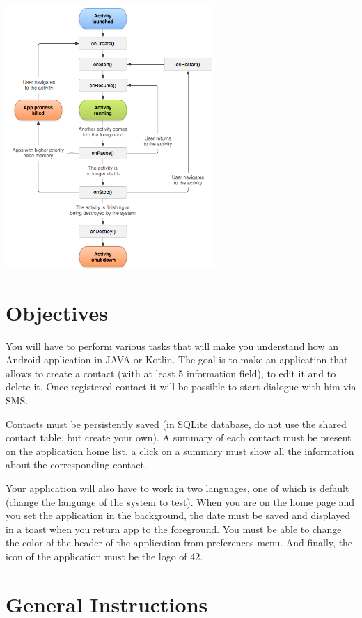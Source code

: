 \centering

\includegraphics[height=10cm]{activity-lifecycle.png}

\raggedright

\section{Objectives}

You will have to perform various tasks that will make you understand how an Android application in JAVA or Kotlin. The goal is to make an application that allows to create a contact (with at least 5 information field), to edit it and to delete it. Once registered contact it will be possible to start dialogue with him via SMS\@.

Contacts must be persistently saved (in SQLite database, do not use the shared contact table, but create your own). A summary of each contact must be present on the application home list, a click on a summary must show all the information about the corresponding contact.

Your application will also have to work in two languages, one of which is default (change the language of the system to test). When you are on the home page and you set the application in the background, the date must be saved and displayed in a toast when you return app to the foreground. You must be able to change the color of the header of the application from preferences menu. And finally, the icon of the application must be the logo of 42.

\section{General Instructions}

